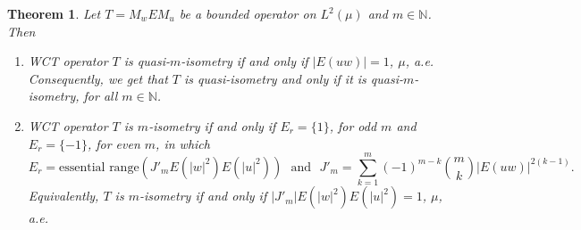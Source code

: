 \documentclass{amsart}
\newtheorem{thm}{Theorem}[section]
\theoremstyle{definition}\newtheorem{defn}[thm]{Definition}
\theoremstyle{remark}
\numberwithin{equation}{section}
\begin{document}
\begin{thm}\label{t1.6}
Let $T=M_wEM_u$ be a bounded operator on $L^2(\mu)$ and $m\in \mathbb{N}$. Then
\begin{enumerate}
  \item WCT operator $T$ is quasi-$m$-isometry if and only if $|E(uw)|=1$, $\mu$, a.e. Consequently, we get that $T$ is quasi-isometry and only if it is quasi-$m$-isometry, for all $m\in \mathbb{N}$.\\
    
  \item WCT operator $T$ is $m$-isometry if and only if $E_r=\{1\}$, for odd $m$ and $E_r=\{-1\}$, for even $m$, in which 
    $$E_r=\text{essential\ range}(J'_mE(|w|^2)E(|u|^2))\ \ \ \text{and} \ \ \ J'_m=\sum_{k=1}^{m}(-1)^{m-k}\binom{m}{k}|E(uw)|^{2(k-1)}.$$
    Equivalently, $T$ is $m$-isometry if and only if $|J'_m|E(|w|^2)E(|u|^2)=1$, $\mu$, a.e.
  
\end{enumerate}
\end{thm}
\end{document}
